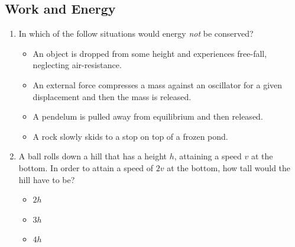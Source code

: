 \documentclass[10pt]{article}
\begin{document}
\subsection{Work and Energy}
\begin{enumerate}
\item In which of the follow situations would energy \textit{not} be conserved?
\begin{itemize}
\item An object is dropped from some height and experiences free-fall, neglecting air-resistance.
\item An external force compresses a mass against an oscillator for a given displacement and then the mass is released.
\item A pendelum is pulled away from equilibrium and then released.
\item A rock slowly skids to a stop on top of a frozen pond.
\end{itemize}
\item A ball rolls down a hill that has a height $h$, attaining a speed $v$ at the bottom.  In order to attain a speed of $2v$ at the bottom, how tall would the hill have to be?
\begin{itemize}
\item $2h$
\item $3h$
\item $4h$
\end{itemize}
\end{enumerate}
\end{document}
